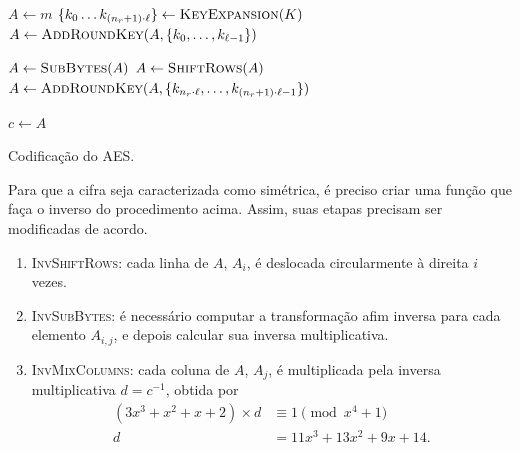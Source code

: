 \documentclass{ufsctex/ufsctex}
\begin{document}
\begin{algorithm}
  \vspace{2mm}

  $A \leftarrow m$\;
  $\{k_{0} \dots k_{(n_r + 1) \cdot \ell}\}
    \leftarrow \textsc{KeyExpansion}(K)$\;
  $A \leftarrow \textsc{AddRoundKey}(A,
    \{k_{0}, \dots, k_{\ell - 1}\})$\;


  $A \leftarrow \textsc{SubBytes}(A)$\;
  $A \leftarrow \textsc{ShiftRows}(A)$\;
  $A \leftarrow \textsc{AddRoundKey}(A,
    \{k_{n_r \cdot \ell}, \dots, k_{(n_r + 1) \cdot \ell - 1}\})$\;

  $c \leftarrow A$\;

  \vspace{2mm}
  \caption{Codificação do AES.}\label{alg:1}
\end{algorithm}

Para que a cifra seja caracterizada como simétrica, é preciso criar uma função
que faça o inverso do procedimento acima. Assim, suas etapas precisam ser
modificadas de acordo.

\begin{enumerate}[label=\roman*.]

  \item \textsc{InvShiftRows}: cada linha de $A$, $A_i$, é deslocada
      circularmente à direita $i$ vezes.

  \item \textsc{InvSubBytes}: é necessário computar a transformação afim
      inversa para cada elemento $A_{i,j}$, e depois calcular sua inversa
        multiplicativa.

  \item \textsc{InvMixColumns}: cada coluna de $A$, $A_j$, é multiplicada pela
      inversa multiplicativa $d = c^{-1}$, obtida por
        \begin{equation}
          \begin{align}
            (3 x^{3} + x^{2} + x + 2) \times d &\equiv 1 \pmod{x^{4} + 1} \\
            d &= 11 x^{3} + 13 x^{2} + 9 x + 14.
          \end{align}
        \end{equation}

\end{enumerate}
\end{document}
